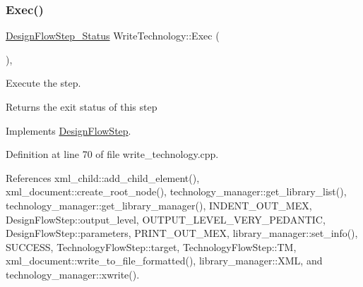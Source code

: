 \mbox{\label{classWriteTechnology_a0effd2133532682e6d116262e4782bf5}} 
\subsubsection{\texorpdfstring{Exec()}{Exec()}}
{\footnotesize\ttfamily \hyperlink{design__flow__step_8hpp_afb1f0d73069c26076b8d31dbc8ebecdf}{Design\+Flow\+Step\+\_\+\+Status} Write\+Technology\+::\+Exec (\begin{DoxyParamCaption}{ }\end{DoxyParamCaption})\hspace{0.3cm}{\ttfamily [override]}, {\ttfamily [virtual]}}



Execute the step. 

\begin{DoxyReturn}{Returns}
the exit status of this step 
\end{DoxyReturn}


Implements \hyperlink{classDesignFlowStep_a77d7e38493016766098711ea24f60b89}{Design\+Flow\+Step}.



Definition at line 70 of file write\+\_\+technology.\+cpp.



References xml\+\_\+child\+::add\+\_\+child\+\_\+element(), xml\+\_\+document\+::create\+\_\+root\+\_\+node(), technology\+\_\+manager\+::get\+\_\+library\+\_\+list(), technology\+\_\+manager\+::get\+\_\+library\+\_\+manager(), I\+N\+D\+E\+N\+T\+\_\+\+O\+U\+T\+\_\+\+M\+EX, Design\+Flow\+Step\+::output\+\_\+level, O\+U\+T\+P\+U\+T\+\_\+\+L\+E\+V\+E\+L\+\_\+\+V\+E\+R\+Y\+\_\+\+P\+E\+D\+A\+N\+T\+IC, Design\+Flow\+Step\+::parameters, P\+R\+I\+N\+T\+\_\+\+O\+U\+T\+\_\+\+M\+EX, library\+\_\+manager\+::set\+\_\+info(), S\+U\+C\+C\+E\+SS, Technology\+Flow\+Step\+::target, Technology\+Flow\+Step\+::\+TM, xml\+\_\+document\+::write\+\_\+to\+\_\+file\+\_\+formatted(), library\+\_\+manager\+::\+X\+ML, and technology\+\_\+manager\+::xwrite().

